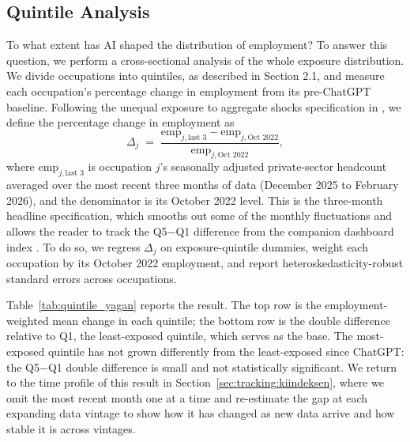 \documentclass[12pt]{article}
\begin{document}
\subsection{Quintile Analysis}\label{sec:regression:quintile}

To what extent has AI shaped the distribution of employment? To answer this question, we perform a cross-sectional analysis of the whole exposure distribution. We divide occupations into quintiles, as described in Section 2.1, and measure each occupation's percentage change in employment from its pre-ChatGPT baseline. Following the unequal exposure to aggregate shocks specification in \cite{yagan2019}, we define the percentage change in employment as
\[
\Delta_j \;=\; \frac{\text{emp}_{j,\text{last 3}} - \text{emp}_{j,\text{Oct }2022}}{\text{emp}_{j,\text{Oct }2022}},
\]
where $\text{emp}_{j,\text{last 3}}$ is occupation $j$'s seasonally adjusted private-sector headcount averaged over the most recent three months of data (December 2025 to February 2026), and the denominator is its October 2022 level. This is the three-month headline specification, which smooths out some of the monthly fluctuations and allows the reader to track the Q5$-$Q1 difference from the companion dashboard index \citep{kiindeksen2026}. To do so, we regress $\Delta_j$ on exposure-quintile dummies, weight each occupation by its October 2022 employment, and report heteroskedasticity-robust standard errors across occupations.

Table~\ref{tab:quintile_yagan} reports the result. The top row is the employment-weighted mean change in each quintile; the bottom row is the double difference relative to Q1, the least-exposed quintile, which serves as the base. The most-exposed quintile has not grown differently from the least-exposed since ChatGPT: the Q5$-$Q1 double difference is small and not statistically significant. We return to the time profile of this result in Section~\ref{sec:tracking:kiindeksen}, where we omit the most recent month one at a time and re-estimate the gap at each expanding data vintage to show how it has changed as new data arrive and how stable it is across vintages.
\end{document}
